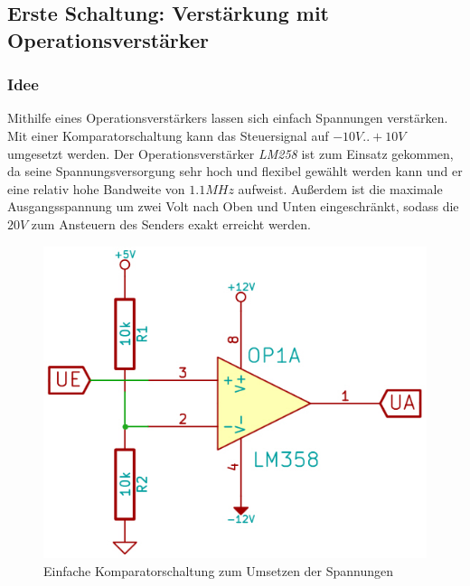 \subsection{Erste Schaltung: Verstärkung mit Operationsverstärker}
\subsubsection{Idee} %
Mithilfe eines Operationsverstärkers lassen sich einfach Spannungen verstärken. Mit einer Komparatorschaltung kann das Steuersignal auf $-10V..+10V$ umgesetzt werden. Der Operationsverstärker \textit{LM258} ist zum Einsatz gekommen, da seine Spannungsversorgung sehr hoch und flexibel gewählt werden kann und er eine relativ hohe Bandweite von $1.1MHz$ aufweist. Außerdem ist die maximale Ausgangsspannung um zwei Volt nach Oben und Unten eingeschränkt, sodass die $20V$ zum Ansteuern des Senders exakt erreicht werden.
\begin{figure}[H]
\centering
\includegraphics[scale=0.5]{images/komparatorschaltung.jpg}
\caption{Einfache Komparatorschaltung zum Umsetzen der Spannungen} \label{img:I1}
\end{figure}

